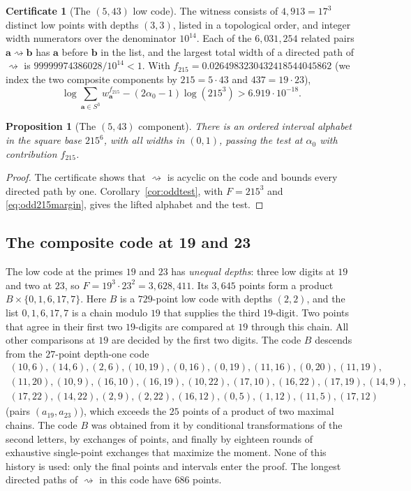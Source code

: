 \documentclass[11pt]{article}
\newtheorem{proposition}[theorem]{Proposition}
\theoremstyle{definition}
\newtheorem{certificate}[theorem]{Certificate}
\theoremstyle{remark}
\newcommand{\al}{\alpha_0}
\newcommand{\sto}{\rightsquigarrow}
\begin{document}
\begin{certificate}[The $(5,43)$ low code]\label{cert:odd215}
The witness consists of $4{,}913=17^3$ distinct low points with depths
$(3,3)$, listed in a topological order, and integer width numerators over the
denominator $10^{14}$. Each of the $6{,}031{,}254$ related pairs
$\mathbf a\sto\mathbf b$ has $\mathbf a$ before $\mathbf b$ in the list, and
the largest total width of a directed path of $\sto$ is
$99999974386028/10^{14}<1$. With $f_{215}=0.0264983230432418544045862$ (we
index the two composite components by $215=5\cdot43$ and $437=19\cdot23$),
\begin{equation}\label{eq:odd215margin}
 \log\sum_{\mathbf a\in S^3}w_{\mathbf a}^{f_{215}}-(2\al-1)\log(215^3)>6.919\cdot10^{-18}.
\end{equation}
\end{certificate}

\begin{proposition}[The $(5,43)$ component]\label{prop:odd215}
There is an ordered interval alphabet in the square base $215^6$, with all
widths in $(0,1)$, passing the test at $\al$ with contribution $f_{215}$.
\end{proposition}
\begin{proof}
The certificate shows that $\sto$ is acyclic on the code and bounds every
directed path by one. Corollary~\ref{cor:oddtest}, with $F=215^3$ and
\eqref{eq:odd215margin}, gives the lifted alphabet and the test.
\end{proof}

\subsection{The composite code at 19 and 23}
The low code at the primes $19$ and $23$ has \emph{unequal depths}: three low
digits at $19$ and two at $23$, so $F=19^3\cdot23^2=3{,}628{,}411$. Its
$3{,}645$ points form a product $B\times\{0,1,6,17,7\}$. Here
$B$ is a $729$-point low code with depths $(2,2)$, and the list
$0,1,6,17,7$ is a chain modulo $19$ that supplies the third $19$-digit. Two points
that agree in their first two $19$-digits are compared at $19$ through this
chain. All other comparisons at $19$ are decided by the first two digits.
The code $B$ descends from the $27$-point depth-one code
\[
\begin{gathered}
(10,6),(14,6),(2,6),(10,19),(0,16),(0,19),(11,16),(0,20),(11,19),\\
(11,20),(10,9),(16,10),(16,19),(10,22),(17,10),(16,22),(17,19),(14,9),\\
(17,22),(14,22),(2,9),(2,22),(16,12),(0,5),(1,12),(11,5),(17,12)
\end{gathered}
\]
(pairs $(a_{19},a_{23})$), which exceeds the $25$ points of a product of
two maximal chains. The code $B$ was obtained from it by conditional
transformations of the second letters, by exchanges of points, and
finally by eighteen rounds of exhaustive single-point exchanges that
maximize the moment. None of this history is used: only the final points
and intervals enter the proof. The longest directed paths of $\sto$ in this
code have $686$ points.
\end{document}
